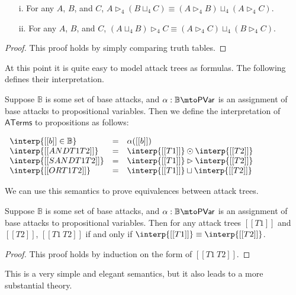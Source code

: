\begin{lemma}
  \label{lemma:sequential_conjunction_distributes_over_choice}
  \begin{itemize}
  \item[i.] For any $A$, $B$, and $C$, $A \rhd_4 (B \sqcup_4 C) \equiv (A \rhd_4 B) \sqcup_4 (A \rhd_4 C)$.
  \item[ii.] For any $A$, $B$, and $C$, $(A \sqcup_4 B) \rhd_4 C \equiv (A \rhd_4 C) \sqcup_4 (B \rhd_4 C)$.
  \end{itemize}
\end{lemma}
\begin{proof}
  This proof holds by simply comparing truth tables.
\end{proof}

At this point it is quite easy to model attack trees as formulas.  The
following defines their interpretation.
\begin{definition}
  \label{def:interp-aterms-ternary}
  Suppose $\mathbb{B}$ is some set of base attacks, and $\alpha :
  \mathbb{B} \mto \mathsf{PVar}$ is an assignment of base attacks to
  propositional variables.  Then we define the interpretation of
  $\mathsf{ATerms}$ to propositions as follows:
  \begin{center}
    \begin{math}
      \begin{array}{lll}
        \interp{[[b]] \in \mathbb{B}} & = & \alpha([[b]])\\
        \interp{[[AND T1 T2]]} & = & \interp{[[T1]]} \odot \interp{[[T2]]}\\
        \interp{[[SAND T1 T2]]} & = & \interp{[[T1]]} \rhd \interp{[[T2]]}\\
        \interp{[[OR T1 T2]]} & = & \interp{[[T1]]} \sqcup \interp{[[T2]]}\\
      \end{array}
    \end{math}
  \end{center}
\end{definition}
We can use this semantics to prove equivalences between attack trees.
\begin{lemma}
  \label{lemma:equivalence_of_attack_trees}
  Suppose $\mathbb{B}$ is some set of base attacks, and $\alpha :
  \mathbb{B} \mto \mathsf{PVar}$ is an assignment of base attacks to
  propositional variables.  Then for any attack trees $[[T1]]$ and
  $[[T2]]$, $[[T1 ~ T2]]$ if and only if $\interp{[[T1]]} \equiv \interp{[[T2]]}$.
\end{lemma}
\begin{proof}
  This proof holds by induction on the form of $[[T1 ~ T2]]$.
\end{proof}
This is a very simple and elegant semantics, but it also leads to a
more substantial theory.
